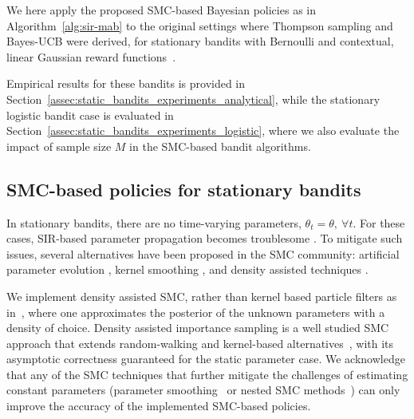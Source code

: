 
We here apply the proposed SMC-based Bayesian policies as in Algorithm~\ref{alg:sir-mab}
to the original settings where Thompson sampling and Bayes-UCB were derived,
\ie for stationary bandits with Bernoulli and contextual, linear Gaussian reward functions~\cite{ip-Kaufmann2012,ip-Garivier2011a,ic-Korda2013,ip-Agrawal2013a}.

Empirical results for these bandits is provided in Section~\ref{assec:static_bandits_experiments_analytical},
while the stationary logistic bandit case is evaluated in Section~\ref{assec:static_bandits_experiments_logistic},
where we also evaluate the impact of sample size $M$ in the SMC-based bandit algorithms.

\subsection{SMC-based policies for stationary bandits}
\label{assec:static_bandits_smc}
In stationary bandits, 
there are no time-varying parameters, \ie $\theta_t=\theta, \ \forall t$.
For these cases, SIR-based parameter propagation becomes troublesome \cite{b-Liu2001}.
To mitigate such issues, several alternatives have been proposed in the SMC community:
\eg artificial parameter evolution \cite{j-Gordon1993},
kernel smoothing \cite{b-Liu2001}, and density assisted techniques \cite{ip-Djuric2004}.

We implement density assisted SMC,
rather than kernel based particle filters as in~\cite{j-Cherkassky2013},
where one approximates the posterior of the unknown parameters with a density of choice.
%
Density assisted importance sampling is a well studied SMC approach
that extends random-walking and kernel-based alternatives~\cite{j-Gordon1993, ib-Liu2001, ip-Djuric2004},
with its asymptotic correctness guaranteed for the static parameter case.
We acknowledge that any of the SMC techniques that further mitigate
the challenges of estimating constant parameters
(\eg parameter smoothing~\cite{j-Carvalho2010,j-Olsson2006,j-Olsson2014}
or nested SMC methods~\cite{j-Chopin2011,j-Crisan2013})
can only improve the accuracy of the implemented SMC-based policies. 

